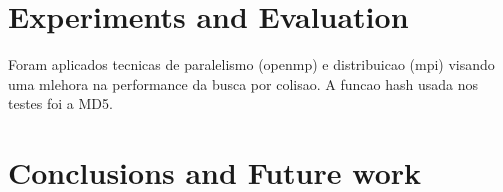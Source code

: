 \documentclass[letterpaper,conference]{IEEEtran}
\begin{document}
\section{Experiments and Evaluation}

Foram aplicados tecnicas de paralelismo (openmp) e distribuicao (mpi) visando uma mlehora na performance
da busca por colisao. A funcao hash usada nos testes foi a MD5.

\section{Conclusions and Future work}



\end{document}
